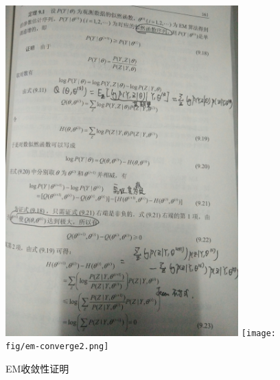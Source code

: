 \documentclass{ctexart}
\begin{document}
\begin{figure}[H]
\begin{center}
\includegraphics[width=0.8\textwidth]{fig/em-converge1.jpg} 
\texttt{[image: fig/em-converge2.png]} 
\caption{EM收敛性证明}
\end{center}
\end{figure}
\end{document}
